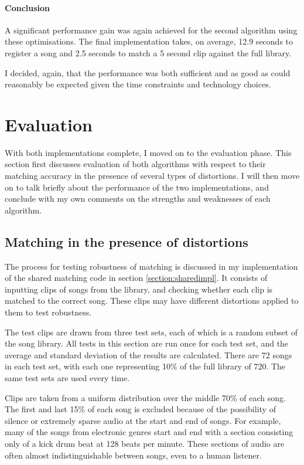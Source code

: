 \documentclass[12pt,a4paper,twoside,openright]{report}
\begin{document}
\subsubsection{Conclusion}

A significant performance gain was again achieved for the second algorithm using these optimisations. The final implementation takes, on average, 12.9 seconds to register a song and 2.5 seconds to match a 5 second clip against the full library.

I decided, again, that the performance was both sufficient and as good as could reasonably be expected given the time constraints and technology choices.



\chapter{Evaluation}
\label{evaluation}

With both implementations complete, I moved on to the evaluation phase. This section first discusses evaluation of both algorithms with respect to their matching accuracy in the presence of several types of distortions. I will then move on to talk briefly about the performance of the two implementations, and conclude with my own comments on the strengths and weaknesses of each algorithm.


\section{Matching in the presence of distortions}
\label{evaluation:matching_with_distortion}

The process for testing robustness of matching is discussed in my implementation of the shared matching code in section \ref{section:sharedimpl}. It consists of inputting clips of songs from the library, and checking whether each clip is matched to the correct song. These clips may have different distortions applied to them to test robustness.

The test clips are drawn from three test sets, each of which is a random subset of the song library. All tests in this section are run once for each test set, and the average and standard deviation of the results are calculated. There are 72 songs in each test set, with each one representing 10\% of the full library of 720. The same test sets are used every time.

Clips are taken from a uniform distribution over the middle 70\% of each song. The first and last 15\% of each song is excluded because of the possibility of silence or extremely sparse audio at the start and end of songs. For example, many of the songs from electronic genres start and end with a section consisting only of a kick drum beat at 128 beats per minute. These sections of audio are often almost indistinguishable between songs, even to a human listener.
\end{document}
